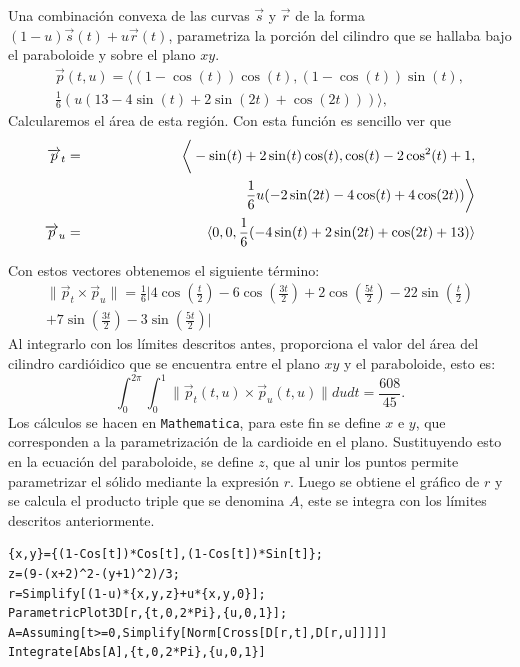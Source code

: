 Una combinación convexa de las curvas $\overrightarrow{s}$ y $\overrightarrow{r}$ de la forma $(1-u)\overrightarrow{s}(t)+u\overrightarrow{r}(t)$,
parametriza la porción del cilindro que se hallaba bajo el paraboloide y sobre el plano $xy$.
\begin{gather*} \overrightarrow{p}(t,u)=\big\langle (1-\cos(t))\cos(t),(1-\cos(t))\sin(t), \\ \frac{1}{6}\left(u(13-4\sin(t)+2\sin(2t)+\cos(2t)) \right)\big\rangle,
\end{gather*}
Calcularemos el área de esta región. Con esta función es sencillo ver que
\begin{eqnarray*}
\overrightarrow{p}_{t}&=& \bigg \langle-\sin(t)+2\sin(t)\cos(t),\cos(t)-2\cos^{2}(t)+1,\\
&& \hspace{3.8cm} \frac{1}{6} u (-2 \sin (2 t)-4 \cos (t)+4\cos(2t)) \bigg \rangle \\
\overrightarrow{p}_{u}&=& \la 0,0,\frac{1}{6} (-4 \sin (t)+2 \sin (2 t)+\cos (2 t)+13) \ra
\end{eqnarray*}

Con estos vectores obtenemos el siguiente término:
\begin{multline*}
\|\overrightarrow{p}_{t}\times \overrightarrow{p}_{u}\|  =
\frac{1}{6}\bigg |4\cos\left(\frac{t}{2}\right)-6\cos\left(\frac{3t}{2}\right)+2\cos\left(\frac{5t}{2}\right)-22\sin\left(\frac{t}{2}\right)\\
+7\sin\left(\frac{3t}{2}\right)-3\sin\left(\frac{5t}{2}\right)\bigg |
\end{multline*}
Al integrarlo con los límites descritos antes, proporciona el valor del área del cilindro cardióidico que se encuentra entre el plano $xy$ y el paraboloide, esto es:
\[\int_{0}^{2\pi}\int_{0}^{1}\|\overrightarrow{p}_{t}(t,u)\times \overrightarrow{p}_{u}(t,u)\|dudt=\frac{608}{45}.\]
Los cálculos se hacen en \verb"Mathematica", para este fin se define $x$ e $y$, que corresponden a la parametrización de la cardioide en el plano. Sustituyendo esto en la ecuación del paraboloide, se define
$z$, que al unir los puntos permite parametrizar el sólido mediante la expresión $r$.
Luego se obtiene el gráfico de $r$ y se calcula el producto triple que se denomina $A$, este se integra con los límites descritos anteriormente.

\begin{tcolorbox}[title=\bf Instrucción en \verb"Mathematica"]\begin{Verbatim}[formatcom=\letraverbatim]
{x,y}={(1-Cos[t])*Cos[t],(1-Cos[t])*Sin[t]};
z=(9-(x+2)^2-(y+1)^2)/3;
r=Simplify[(1-u)*{x,y,z}+u*{x,y,0}];
ParametricPlot3D[r,{t,0,2*Pi},{u,0,1}];
A=Assuming[t>=0,Simplify[Norm[Cross[D[r,t],D[r,u]]]]]
Integrate[Abs[A],{t,0,2*Pi},{u,0,1}]
\end{Verbatim}
\end{tcolorbox}


